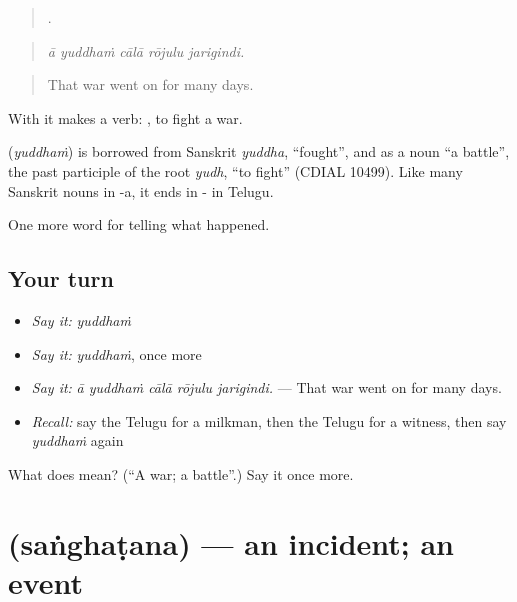 \begin{quote}
    .
\end{quote}

\begin{quote}
\emph{ā yuddhaṁ cālā rōjulu jarigindi.}
\end{quote}

\begin{quote}
That war went on for many days.
\end{quote}

With  it makes a verb:  , to fight a war.

\begin{cousinweb}
\textbf{} (\emph{yuddhaṁ}) is borrowed from Sanskrit \emph{yuddha}, \textquotedblleft{}fought\textquotedblright{}, and as a noun \textquotedblleft{}a battle\textquotedblright{}, the past participle of the root \emph{yudh}, \textquotedblleft{}to fight\textquotedblright{} (CDIAL 10499). Like many Sanskrit nouns in -a, it ends in - in Telugu.
\end{cousinweb}

\begin{grammarlens}[title={What you've built}]
One more word for telling what happened.
\end{grammarlens}

\subsection*{Your turn}
\begin{itemize}
\raggedright
  \item \emph{Say it:} \emph{yuddhaṁ}
  \item \emph{Say it:} \emph{yuddhaṁ}, once more
  \item \emph{Say it:} \emph{ā yuddhaṁ cālā rōjulu jarigindi.} — That war went on for many days.
  \item \emph{Recall:} say the Telugu for a milkman, then the Telugu for a witness, then say \emph{yuddhaṁ} again
\end{itemize}

\begin{tcolorbox}[breakable,colback=teal!4,colframe=teal!35!black,title={Before you move on}]
What does  mean? (\textquotedblleft{}A war; a battle\textquotedblright{}.) Say it once more.
\end{tcolorbox}
\section[\texorpdfstring{\te{సంఘటన} (saṅghaṭana)}{సంఘటన (saṅghaṭana)}]{ (saṅghaṭana) — an incident; an event}

